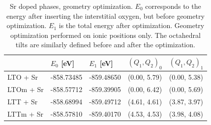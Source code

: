 \begin{table}[b]
	\centering
	\caption[Sr doped phases: Energy]{Sr doped phases, geometry optimization. $E_0$ corresponds to the energy after inserting the interstitial oxygen, but before geometry optimization. $E_1$ is the total energy after optimization. Geometry optimization performed on ionic positions only. The octahedral tilts are similarly defined before and after the optimization.}
	\label{tab:oint_lsco_en}
	\begin{tabular}{@{}lllll@{}}
    \toprule
	 & $E_0$ [eV] & $E_1$ [eV] & $(Q_1, Q_2)_0$ & $(Q_1, Q_2)_1$  \\ 
	\midrule
    LTO + Sr                  & -858.73485             & -859.48650  & (0.00, 5.79) & (0.00, 5.38) \\
	LTOm + Sr                    & -858.57712             & -859.39905  & (0.00, 6.42) & (0.00, 5.69) \\
	LTT + Sr                    & -858.68994            & -859.49712  & (4.61, 4.61) & (3.87, 3.97) \\
	LTTm + Sr                    & -858.57810           & -859.40170  & (4.53, 4.53) & (3.98, 4.08) \\
	\bottomrule
    \end{tabular}
\end{table}

